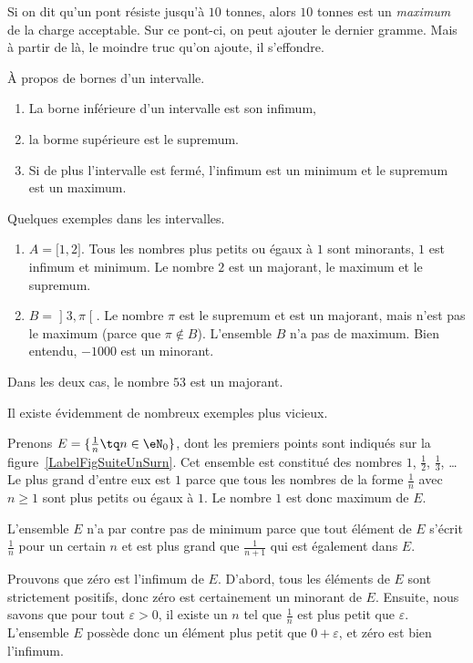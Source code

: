 \begin{example}
Si on dit qu'un pont résiste jusqu'à $10$ tonnes, alors $10$ tonnes est un \emph{maximum} de la charge acceptable. Sur ce pont-ci, on peut ajouter le dernier gramme. Mais à partir de là, le moindre truc qu'on ajoute, il s'effondre.
\end{example}

\begin{lemma}       \label{LEMooWCUXooFqTwDK}
    À propos de bornes d'un intervalle.
    \begin{enumerate}
        \item
	        La borne inférieure d'un intervalle est son infimum, 
        \item
            la borme supérieure est le supremum. 
        \item
            Si de plus l'intervalle est fermé, l'infimum est un minimum et le supremum est un maximum.
    \end{enumerate}
\end{lemma}


\begin{example}
    Quelques exemples dans les intervalles.
	\begin{enumerate}
		\item
			$A=\mathopen[ 1 , 2 \mathclose]$. Tous les nombres plus petits ou égaux à $1$ sont minorants, $1$ est infimum et minimum. Le nombre $2$ est un majorant, le maximum et le supremum.
		\item
			$B=\mathopen] 3 , \pi \mathclose[$. Le nombre $\pi$ est le supremum et est un majorant, mais n'est pas le maximum (parce que $\pi\notin B$). L'ensemble $B$ n'a pas de maximum. Bien entendu, $-1000$ est un minorant.
	\end{enumerate}
    Dans les deux cas, le nombre $53$ est un majorant.
\end{example}

Il existe évidemment de nombreux exemples plus vicieux.

\begin{example}
	Prenons $E=\{ \frac{1}{ n }\tq n\in\eN_0 \}$, dont les premiers points sont indiqués sur la figure~\ref{LabelFigSuiteUnSurn}. Cet ensemble est constitué des nombres $1$, $\frac{ 1 }{2}$, $\frac{1}{ 3 }$, \ldots Le plus grand d'entre eux est $1$ parce que tous les nombres de la forme $\frac{1}{ n }$ avec $n\geq 1$ sont plus petits ou égaux à $1$. Le nombre $1$ est donc maximum de $E$.

	L'ensemble $E$ n'a par contre pas de minimum parce que tout élément de $E$ s'écrit $\frac{1}{ n }$ pour un certain $n$ et est plus grand que $\frac{1}{ n+1 }$ qui est également dans $E$.

	Prouvons que zéro est l'infimum de $E$. D'abord, tous les éléments de $E$ sont strictement positifs, donc zéro est certainement un minorant de $E$. Ensuite, nous savons que pour tout $\varepsilon>0$, il existe un $n$ tel que $\frac{1}{ n }$ est plus petit que $\varepsilon$. L'ensemble $E$ possède donc un élément plus petit que $0+\varepsilon$, et zéro est bien l'infimum.
\end{example}

